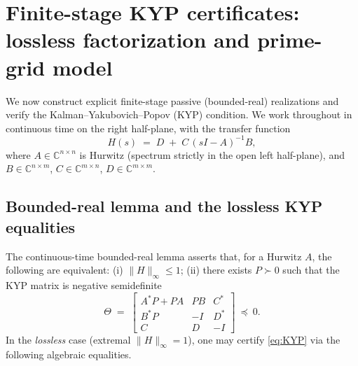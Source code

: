 \documentclass[11pt]{article}
\theoremstyle{definition}
\theoremstyle{remark}
\newcommand{\C}{\mathbb{C}}
\begin{document}
\section{Finite-stage KYP certificates: lossless factorization and prime-grid model}\label{sec:KYP}
We now construct explicit finite-stage passive (bounded-real) realizations and verify the Kalman--Yakubovich--Popov (KYP) condition. We work throughout in continuous time on the right half-plane, with the transfer function
\[
 H(s)\;=\;D\; +\; C\,(sI-A)^{-1} B,
\]
where \(A\in\C^{n\times n}\) is Hurwitz (spectrum strictly in the open left half-plane), and \(B\in\C^{n\times m}\), \(C\in\C^{m\times n}\), \(D\in\C^{m\times m}\).
\subsection{Bounded-real lemma and the lossless KYP equalities}
The continuous-time bounded-real lemma asserts that, for a Hurwitz \(A\), the following are equivalent: (i) \(\|H\|_\infty\le 1\); (ii) there exists \(P\succ 0\) such that the KYP matrix is negative semidefinite
\begin{equation}\label{eq:KYP}
 \Theta\;=\;\begin{bmatrix}
  A^*P+PA & PB & C^*\\
  B^*P & -I & D^*\\
  C & D & -I
 \end{bmatrix}\ \preceq\ 0.
\end{equation}
In the \emph{lossless} case (extremal \(\|H\|_\infty=1\)), one may certify \eqref{eq:KYP} via the following algebraic equalities.
\end{document}
